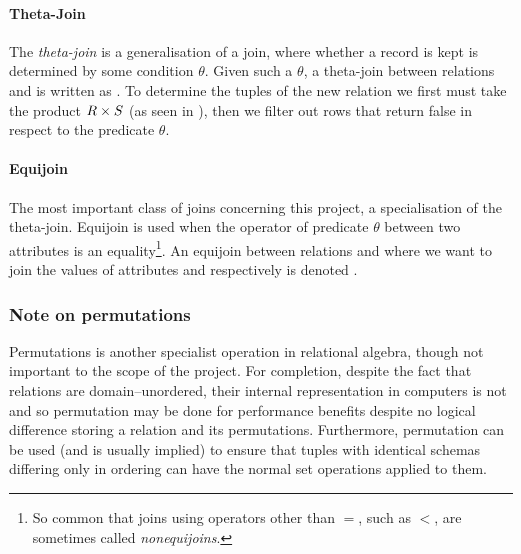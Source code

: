 \paragraph{Theta-Join} The \emph{theta-join} is a generalisation of a join, where whether a record is kept is determined by some condition $\theta$. Given such a $\theta$, a theta-join between relations  and  is written as . To determine the tuples of the new relation  we first must take the product $R \times S$ (as seen in ), then we filter out rows that return false in respect to the predicate $\theta$.\cite{DatabaseSystems}

\paragraph{Equijoin} The most important class of joins concerning this project, a specialisation of the theta-join. Equijoin is used when the operator of predicate $\theta$ between two attributes is an equality\footnote{So common that joins using operators other than $=$, such as $<$, are sometimes called \emph{nonequijoins}.\cite{JoinProcessing}}.\cite{JoinProcessing} An equijoin between relations  and  where we want to join the values of attributes  and  respectively is denoted .
\subsubsection{Note on permutations}
Permutations is another specialist operation in relational algebra, though not important to the scope of the project. For completion, despite the fact that relations are domain--unordered, their internal representation in computers is not and so permutation may be done for performance benefits despite no logical difference storing a relation and its permutations.\cite{RelationalModel} Furthermore, permutation can be used (and is usually implied) to ensure that tuples with identical schemas differing only in ordering can have the normal set operations applied to them. \cite{DatabaseSystems}
